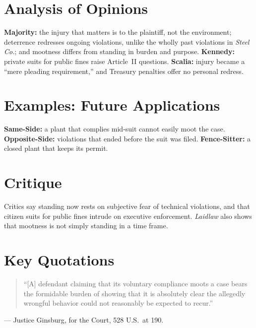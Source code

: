 \documentclass[12pt]{article}
\begin{document}
\section{Analysis of Opinions}
\textbf{Majority:} the injury that matters is to the plaintiff, not the environment; deterrence redresses ongoing violations, unlike the wholly past violations in \textit{Steel Co.}; and mootness differs from standing in burden and purpose. \textbf{Kennedy:} private suits for public fines raise Article~II questions. \textbf{Scalia:} injury became a ``mere pleading requirement,'' and Treasury penalties offer no personal redress.

\section{Examples: Future Applications}
\textbf{Same-Side:} a plant that complies mid-suit cannot easily moot the case. \textbf{Opposite-Side:} violations that ended before the suit was filed. \textbf{Fence-Sitter:} a closed plant that keeps its permit.

\section{Critique}
Critics say standing now rests on subjective fear of technical violations, and that citizen suits for public fines intrude on executive enforcement. \textit{Laidlaw} also shows that mootness is not simply standing in a time frame.

\section{Key Quotations}
\begin{quote}
``[A] defendant claiming that its voluntary compliance moots a case bears the formidable burden of showing that it is absolutely clear the allegedly wrongful behavior could not reasonably be expected to recur.''
\end{quote}
\noindent --- Justice Ginsburg, for the Court, 528 U.S.\ at 190.
\end{document}
